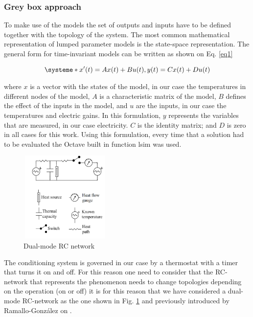 \documentclass[10pt, conference, compsocconf]{IEEEtran}
\begin{document}
\subsubsection{ Grey box approach}


To make use of the models the set of outputs and inputs have to be defined together with the topology of the system. 
The most common mathematical representation of lumped parameter models is the state-space representation. The general form for time-invariant models can be written as shown on Eq. \ref{eq1}

\begin{equation}\label{eq1}
\systeme*{x'(t)=Ax(t) + Bu(t), y(t)= Cx(t) + Du(t)}
\end{equation}

where $x$ is a vector with the states of the model, in our case the temperatures in different nodes of the model, $A$ is a characteristic matrix of the model, $B$ defines the effect of the inputs in the model, and $u$ are the inputs, in our case the temperatures and electric gains. In this formulation, $y$ represents the variables that are measured, in our case electricity. $C$ is the identity matrix; and $D$ is zero in all cases for this work. Using this formulation, every time that a solution had to be evaluated the Octave built in function lsim was used.

\begin{figure}[h]%
\centering
\centerline{\includegraphics[width=4.5cm,height=4.5cm,keepaspectratio]{./pics/figAlf.pdf}}
\caption{Dual-mode RC network}\vspace*{-6pt}
  \label{fig:alf}
\end{figure}

The conditioning system is governed in our case by a thermostat with a timer that turns it on and off. For this reason one need to consider that the RC-network that represents the phenomenon needs to change topologies depending on the operation (on or off) it is for this reason that we have considered a dual-mode RC-network as the one shown in Fig. \ref{fig:alf} and previously introduced by Ramallo-Gonz\'alez on \cite{ramalloidentifying}.
\end{document}
